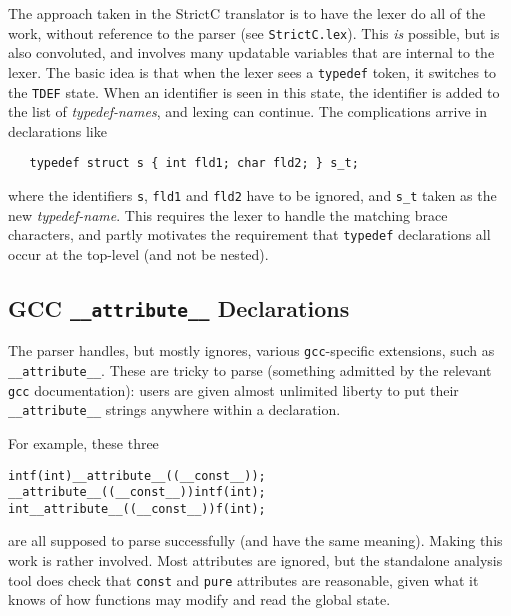 \documentclass{article}
\newcommand{\strictc}{\textsf{StrictC}}
\newcommand{\srcfile}[1]{\texttt{#1}}
\begin{document}
The approach taken in the \strictc{} translator is to have the lexer do
all of the work, without reference to the parser (see
\srcfile{StrictC.lex}).  This \emph{is} possible, but is also convoluted,
and involves many updatable variables that are internal to the lexer.
The basic idea is that when the lexer sees a \texttt{typedef} token,
it switches to the \texttt{TDEF} state.  When an identifier is seen in
this state, the identifier is added to the list of
\textit{typedef-names}, and lexing can continue.  The complications
arrive in declarations like
\begin{verbatim}
   typedef struct s { int fld1; char fld2; } s_t;
\end{verbatim}
where the identifiers \texttt{s}, \texttt{fld1} and \texttt{fld2} have
to be ignored, and \texttt{s_t} taken as the new \emph{typedef-name}.
This requires the lexer to handle the matching brace characters, and
partly motivates the requirement that \texttt{typedef} declarations
all occur at the top-level (and not be nested).

\subsection{GCC \texttt{__attribute__} Declarations}
\label{sec:gcc-attributes}

The parser handles, but mostly ignores, various \texttt{gcc}-specific
extensions, such as \texttt{__attribute__}.  These are tricky to parse
(something admitted by the relevant \texttt{gcc} documentation): users
are given almost unlimited liberty to put their \texttt{__attribute__}
strings anywhere within a declaration.

\smallskip\noindent
For example, these three
\begin{alltt}
   int f(int) __attribute__((__const__));
   __attribute__((__const__)) int f(int);
   int __attribute__((__const__)) f(int);
\end{alltt}
are all supposed to parse successfully (and have the same meaning).
Making this work is rather involved.  Most attributes are ignored, but
the standalone analysis tool does check that \texttt{const} and
\texttt{pure} attributes are reasonable, given what it knows of how
functions may modify and read the global state.



\end{document}
